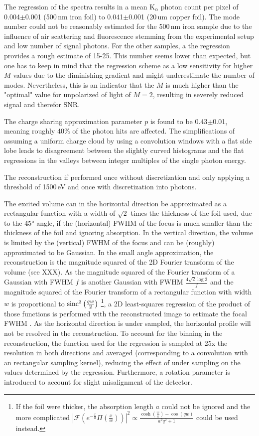 The regression of the spectra results in a mean K$_{\alpha}$ photon count per pixel of 0.004$\pm$0.001 (500\,nm iron foil) to 0.041$\pm$0.001 (20\,um copper foil). The mode number could not be reasonably estimated for the 500\,nm iron sample due to the influence of air scattering and fluorescence stemming from the experimental setup and low number of signal photons. For the other samples, a the regression provides a rough estimate of 15-25. This number seems lower than expected, but one has to keep in mind that the regression scheme as a low sensitivity for higher $M$ values due to the diminishing gradient and might underestimate the number of modes. Nevertheless, this is an indicator that the $M$ is much higher than the "optimal" value for unpolarized of light of $M=2$, resulting in severely reduced signal and therefor SNR.

The charge sharing approximation parameter $p$ is found to be 0.43$\pm$0.01, meaning roughly 40\% of the photon hits are affected. The simplifications of assuming a uniform charge cloud by using a convolution windows with a flat side lobe leads to disagreement between the slightly curved histograms and the flat regressions in the valleys between integer multiples of the single photon energy.

The reconstruction if performed once without discretization and only applying a threshold of 1500\,eV and once with discretization into photons. 




The excited volume can in the horizontal direction be approximated as a rectangular function with a width of $\sqrt{2}$-times the thickness of the foil used, due to the 45° angle, if the (horizontal) FWHM of the focus is much smaller than the thickness of the foil and ignoring absorption.  In the vertical direction, the volume is limited by the (vertical) FWHM of the focus and can be (roughly) approximated to be Gaussian. 
In the small angle approximation, the reconstruction is the magnitude squared of the 2D Fourier transform of the volume (see XXX). As the magnitude squared of the Fourier transform of a Gaussian with FWHM $f$ is another Gaussian with FWHM $\frac{4\sqrt{2}\log{2}}{f}$ and the magnitude squared of the Fourier transform of a rectangular function with width $w$ is proportional to $\operatorname{sinc}^2{\left(\frac{q w}{2}\right)}$
\footnote{If the foil were thicker, the absorption length $a$ could not be ignored and the more complicated $\left|\mathscr{F}\left(e^{-\frac{x}{a}} \Pi \left(\frac{x}{w}\right)\right)\right|^2 \propto \frac{\cosh \left(\frac{w}{a}\right)-\cos (q w)}{a^2 q^2+1}$
 could be used instead.}, a 2D least-squares regression of the product of those functions is performed with the reconstructed image to estimate the focal FWHM \cite{butz2015}. As the horizontal direction is under sampled, the horizontal profile will not be resolved in the reconstruction. To account for the binning in the reconstruction, the function used for the regression is sampled at 25x the resolution in both directions and averaged (corresponding to a convolution with an rectangular sampling kernel), reducing the effect of under sampling on the values determined by the regression. Furthermore, a rotation parameter is introduced to account for slight misalignment of the detector.

